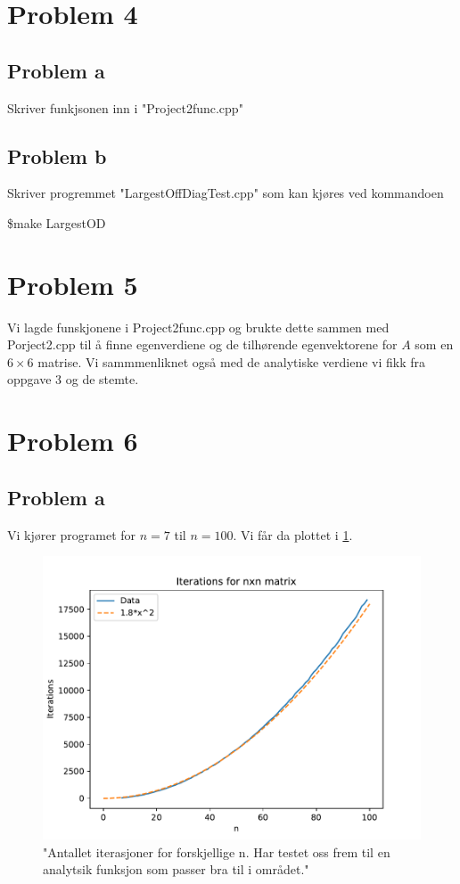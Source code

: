 \documentclass[reprint,english,notitlepage]{revtex4-1}  %
\begin{document}
\section*{Problem 4}

\subsection*{Problem a}

Skriver funkjsonen inn i "Project2func.cpp"

\subsection*{Problem b}

Skriver progremmet "LargestOffDiagTest.cpp" som kan kjøres ved kommandoen

\$make LargestOD
\section*{Problem 5}
Vi lagde funskjonene i Project2func.cpp og brukte dette sammen med Porject2.cpp til å finne egenverdiene og de tilhørende egenvektorene for $A$ som  en $6\times6$ matrise. Vi sammmenliknet også med de analytiske verdiene vi fikk fra oppgave 3 og de stemte.
\section*{Problem 6}
\subsection*{Problem a}
Vi kjører programet for $n = 7$ til $n = 100$. Vi får da plottet i \ref{plotit}.

\begin{figure}
	\centering
	\includegraphics[scale=0.6]{Images/Iterations.pdf}
	\caption{"Antallet iterasjoner for forskjellige n. Har testet oss frem til en analytsik funksjon som passer bra til i området."}
	\label{plotit}
\end{figure}
\end{document}
